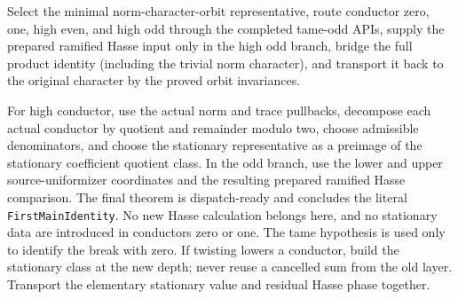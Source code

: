 \begin{theorem}
\label{mod:cases-tameoddpreparation}
Select the minimal norm-character-orbit representative, route conductor zero,
one, high even, and high odd through the completed tame-odd APIs, supply the
prepared ramified Hasse input only in the high odd branch, bridge the full
product identity (including the trivial norm character), and transport it back
to the original character by the proved orbit invariances.

For high conductor, use the actual norm and trace pullbacks, decompose each
actual conductor by quotient and remainder modulo two, choose admissible
denominators, and choose the stationary representative as a preimage of the
stationary coefficient quotient class.  In the odd branch, use the lower and
upper source-uniformizer coordinates and the resulting prepared ramified Hasse
comparison.  The final theorem is dispatch-ready and concludes the literal
\texttt{FirstMainIdentity}.
\leanok
{}
\FormalizationContract
No new Hasse calculation belongs here, and no stationary data are introduced
in conductors zero or one.  The tame hypothesis is used only to identify the
break with zero.  If twisting lowers a conductor, build the stationary class
at the new depth; never reuse a cancelled sum from the old layer.  Transport
the elementary stationary value and residual Hasse phase together.
\end{theorem}
